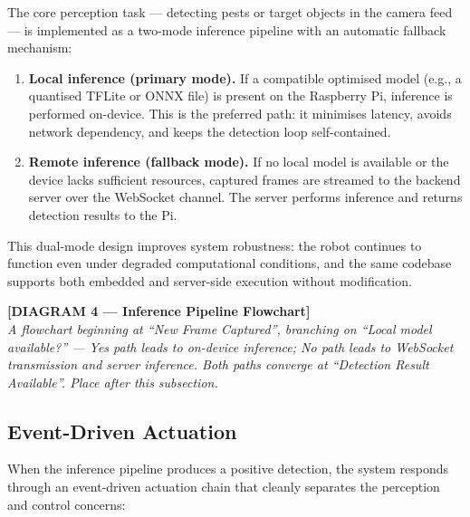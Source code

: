 The core perception task — detecting pests or target objects in the
camera feed — is implemented as a two-mode inference pipeline with an
automatic fallback mechanism:
 
\begin{enumerate}
    \item \textbf{Local inference (primary mode).} If a compatible
          optimised model (e.g., a quantised TFLite or ONNX file) is
          present on the Raspberry Pi, inference is performed
          on-device. This is the preferred path: it minimises latency,
          avoids network dependency, and keeps the detection loop
          self-contained.
 
    \item \textbf{Remote inference (fallback mode).} If no local model
          is available or the device lacks sufficient resources,
          captured frames are streamed to the backend server over
          the WebSocket channel. The server performs inference and
          returns detection results to the Pi.
\end{enumerate}
 
This dual-mode design improves system robustness: the robot continues
to function even under degraded computational conditions, and the
same codebase supports both embedded and server-side execution without
modification.
 
\bigskip
\noindent\textbf{[DIAGRAM 4 — Inference Pipeline Flowchart]}\\
\textit{A flowchart beginning at ``New Frame Captured'', branching on
``Local model available?'' — Yes path leads to on-device inference;
No path leads to WebSocket transmission and server inference. Both
paths converge at ``Detection Result Available''. Place after this
subsection.}
\bigskip
 
\subsection{Event-Driven Actuation}
 
When the inference pipeline produces a positive detection, the system
responds through an event-driven actuation chain that cleanly
separates the perception and control concerns:
 
